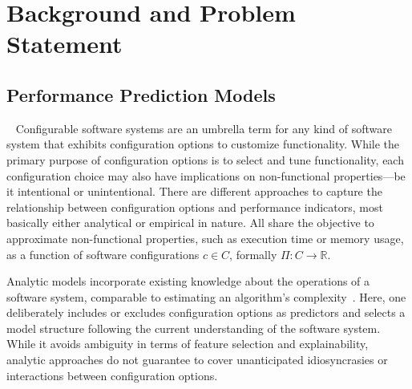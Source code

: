 \section{Background and Problem Statement}
\subsection{Performance Prediction Models}~\label{sec:perfmodels}
Configurable software systems are an umbrella term for any kind of software system that exhibits configuration options to customize functionality. While the primary purpose of configuration options is to select and tune functionality, each configuration choice may also have implications on non-functional properties---be it intentional or unintentional. 
There are different approaches to capture the relationship between configuration options and performance indicators, most basically either analytical or empirical in nature. All share the objective to approximate non-functional properties, such as execution time or memory usage, as a function of software configurations  $c \in C$, formally $\Pi: C \rightarrow \mathbb{R}$. 

Analytic models incorporate existing knowledge about the operations of a software system, comparable to estimating an algorithm’s complexity~\cite{analytic_model_2000,analytic_model_2011}. Here, one deliberately includes or excludes configuration options as predictors and selects a model structure following the current understanding of the software system. While it avoids ambiguity in terms of feature selection and explainability, analytic approaches do not guarantee to cover unanticipated idiosyncrasies or interactions between configuration options.


